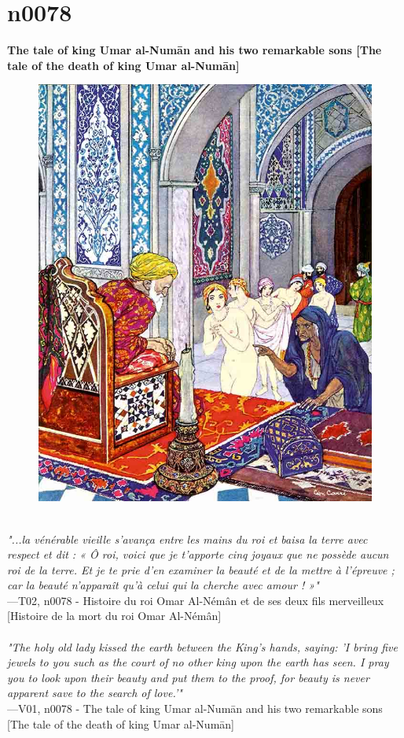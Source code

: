 \documentclass[../Carre_nights.tex]{subfiles}
\begin{document}
\newpage

\section{n0078}
\textbf{\Large{The tale of king Umar al-Num\=an and his two remarkable sons [The tale of the death of king Umar al-Num\=an]}} \\

\begin{figure}[ht]
\centering
\includegraphics[height=\figsize]{illustrations/volume_2/T02, n0078 - Histoire du roi Omar Al-Némân et de ses deux fils merveilleux [Histoire de la mort du roi Omar Al-Némân].jpg}
\end{figure}

\textit{\\
"...la vénérable vieille s’avança entre les mains du roi et baisa la terre avec respect et dit : « Ô roi, voici que je t’apporte cinq joyaux que ne possède aucun roi de la terre. Et je te prie d’en examiner la beauté et de la mettre à l’épreuve ; car la beauté n’apparaît qu’à celui qui la cherche avec amour ! »"} \\
—T02, n0078 - Histoire du roi Omar Al-Némân et de ses deux fils merveilleux [Histoire de la mort du roi Omar Al-Némân] \\~\\
\textit{"The holy old lady kissed the earth between the King's hands, saying: 'I bring five jewels to you such as the court of no other king upon the earth has seen. I pray you to look upon their beauty and put them to the proof, for beauty is never apparent save to the search of love.'"} \\
—V01, n0078 - The tale of king Umar al-Num\=an and his two remarkable sons [The tale of the death of king Umar al-Num\=an]
\end{document}
